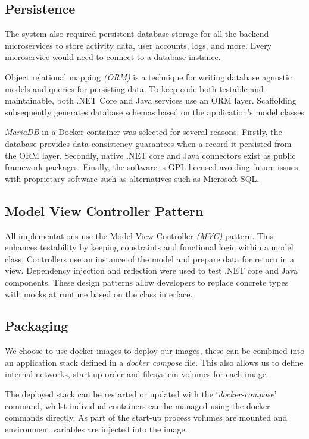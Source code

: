 \subsection{Persistence}
    \par
    The system also required persistent database storage for all the backend microservices to store activity data, user accounts, logs, and more. Every microservice would need to connect to a database instance.

    \par
    Object relational mapping \textit{(ORM)} is a technique for writing database agnostic models and queries for persisting data. To keep code both testable and maintainable, both .NET Core and Java services use an ORM layer. Scaffolding subsequently generates database schemas based on the application's model classes

    \par
    \textit{MariaDB}\cite{MariaDB} in a Docker container was selected for several reasons: Firstly, the database provides data consistency guarantees when a record it persisted from the ORM layer. Secondly, native .NET core and Java connectors exist as public framework packages. Finally, the software is GPL licensed avoiding future issues with proprietary software such as alternatives such as Microsoft SQL.

\subsection{Model View Controller Pattern}
    \par
    All implementations use the Model View Controller \textit{(MVC)}
    pattern. This enhances testability by keeping constraints and functional logic within a model class. Controllers use an instance of the model and prepare data for return in a view. Dependency injection and reflection were used to test .NET core and Java components. These design patterns allow developers to replace concrete types with mocks at runtime based on the class interface.

\subsection{Packaging}
    \par
    We choose to use docker images to deploy our images, these can be combined into an application stack defined in a \textit{docker compose} file. This also allows us to define internal networks, start-up order and filesystem volumes for each image.

    \par
    The deployed stack can be restarted or updated with the `\textit{docker-compose}' command, whilst individual containers can be managed using the docker commands directly. As part of the start-up process volumes are mounted and environment variables are injected into the image.
